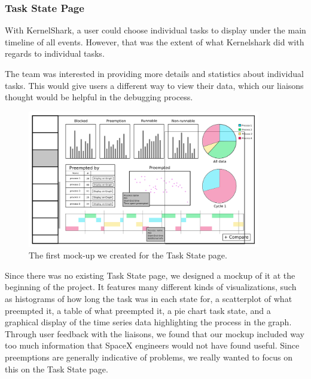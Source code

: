 \documentclass{hmcclinic}
\begin{document}
\subsubsection{Task State Page}

With KernelShark, a user could choose individual tasks to display under
the main timeline of all events. However, that was the extent of what
Kernelshark did with regards to individual tasks.

The team was interested in providing more details and statistics about
individual tasks. This would give users a different way to view
their data, which our liaisons thought would be helpful
in the debugging process.

\begin{figure}[H]
\begin{center}
\includegraphics[width=4in]{perProcess-49.png}
\caption{The first mock-up we created for the Task State page.}
\end{center}
\end{figure}

Since there was no existing Task State page, we designed a mockup of it at the
beginning of the project. It features many different kinds of visualizations,
such as histograms of how long the task was in each state for, a scatterplot of
what preempted it, a table of what preempted it, a pie chart task state, and a
graphical display of the time series data highlighting the process in the graph.
Through user feedback with the liaisons, we found that our mockup included way
too much information that SpaceX engineers would not have found useful. Since
preemptions are generally indicative of problems, we really wanted to focus on
this on the Task State page.
\end{document}
